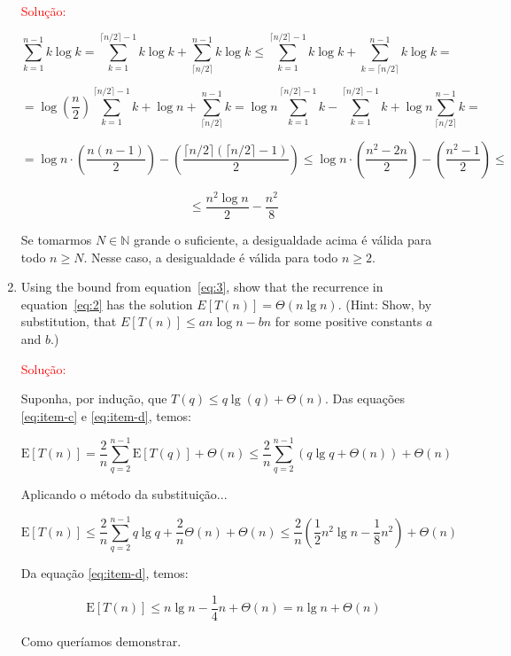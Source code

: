 \documentclass{article}
\begin{document}
\begin{enumerate}[label=(\alph*)]
  \textcolor{red}{Solução: }
  
$$
\sum_{k=1}^{n-1} k \log k = \sum_ {k=1}^{\lceil n/2 \rceil -1} k \log k + \sum_{\lceil n/2 \rceil}^{n-1}k \log k 
\leq
\sum_ {k=1}^{\lceil n/2 \rceil -1} k \log k + \sum_{k= \lceil n/2 \rceil } ^{n-1} k \log k = 
$$

$$ 
= \log \left(\frac{n}{2}\right) \sum_{k=1}^{\lceil n/2 \rceil -1} k + \log n + \sum_{\lceil n/2 \rceil}^{n-1} k = \log n \sum_{k=1}^{\lceil n/2 \rceil -1} k - \sum_{k=1}^{\lceil n/2 \rceil -1} k + \log n \sum_{\lceil n/2 \rceil}^{n-1} k = 
$$

$$
= \log n \cdot \left (  \frac{n(n-1)}{2} \right ) - \left ( \frac{\lceil n/2 \rceil (\lceil n/2 \rceil -1 ) }{2} \right ) 
\leq 
\log n \cdot \left ( \frac{n^2 -2n}{2}  \right ) - \left ( \frac{n^2 -1}{2} \right )  \leq
$$
  
$$
\leq \frac{n^2 \log n}{2} - \frac{n^2}{8} 
$$

Se tomarmos $N \in \mathbb{N}$ grande o suficiente, a desigualdade acima é válida para todo $n \geq N$. Nesse caso, a desigualdade é válida para todo $n \geq 2$. 

\vspace{\baselineskip}


  \item Using the bound from equation~\ref{eq:3}, show that the recurrence in equation~\ref{eq:2} has the solution $E[T(n)]=\Theta(n\lg n)$. (Hint: Show, by substitution, that $E[T(n)] \leq an \log n - bn$ for some positive constants $a$ and $b$.)
  
  \textcolor{red}{Solução: }
  
  Suponha, por indução, que $T(q) \leq q \lg (q)+\Theta(n)$. Das equações \ref{eq:item-c} e \ref{eq:item-d}, temos: 
  
  $$
  \mathrm{E}[T(n)]=\frac{2}{n} \sum_{q=2}^{n-1}     \mathrm{E}[T(q)]+\Theta(n)
  \leq 
  \frac{2}{n} \sum_{q=2}^{n-1}(q \lg q+\Theta(n))+\Theta(n)
  $$
  
  Aplicando o método da substituição...
  
  $$
  \mathrm{E}[T(n)] 
  \leq 
  \frac{2}{n} \sum_{q=2}^{n-1} q \lg q+\frac{2}{n} \Theta(n)+\Theta(n)
  \leq \frac{2}{n}\left(\frac{1}{2} n^{2} \lg n-\frac{1}{8} n^{2}\right)+\Theta(n)
  $$
  
  Da equação \ref{eq:item-d}, temos: 
  
  $$
  \mathrm{E}[T(n)] \leq 
  n \lg n-\frac{1}{4} n+\Theta(n)
   =n \lg n+\Theta(n)
  $$
  
  Como queríamos demonstrar. 
\end{enumerate}
\end{document}
